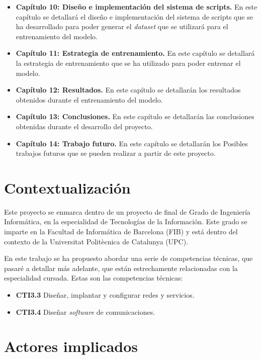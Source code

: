\begin{itemize}
{        en el diálogo.}.
    \item \textbf{Capítulo 10: Diseño e implementación del sistema de scripts.} En este
        capítulo se detallará el diseño e implementación del sistema de scripts que se
        ha desarrollado para poder generar el \textit{dataset} que se utilizará para el
        entrenamiento del modelo.
    \item \textbf{Capítulo 11: Estrategia de entrenamiento.} En este capítulo se detallará
        la estrategia de entrenamiento que se ha utilizado para poder entrenar el modelo.
    \item \textbf{Capítulo 12: Resultados.} En este capítulo se detallarán los resultados
        obtenidos durante el entrenamiento del modelo.
    \item \textbf{Capítulo 13: Conclusiones.} En este capítulo se detallarán las conclusiones
        obtenidas durante el desarrollo del proyecto.
    \item \textbf{Capítulo 14: Trabajo futuro.} En este capítulo se detallarán los Posibles
        trabajos futuros que se pueden realizar a partir de este proyecto.
\end{itemize}

\section{Contextualización}
\label{sec:contextualizacion}


Este proyecto se enmarca dentro de un proyecto de final de Grado de Ingeniería
Informática, en la especialidad de Tecnologías de la Información. Este grado se
imparte en la Facultad de Informática de Barcelona (FIB) y está dentro del contexto
de la Universitat Politècnica de Catalunya (UPC).

En este trabajo se ha propuesto abordar una serie de competencias técnicas, que
pasaré a detallar más adelante, que están estrechamente relacionadas con la
especialidad cursada. Estas son las competencias técnicas:

\begin{itemize}
    \item \textbf{CTI3.3} Diseñar, implantar y configurar redes y servicios.
    \item \textbf{CTI3.4} Diseñar \textit{software} de comunicaciones.
\end{itemize}

\section{Actores implicados}
\label{sec:actores}

